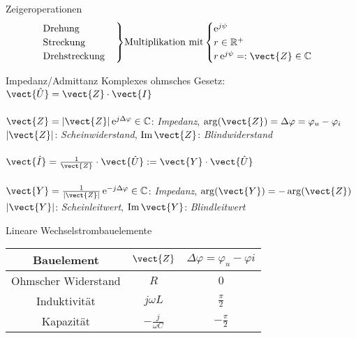\documentclass[a6paper]{kartei}
\newenvironment{rcases}{%
  \left.\renewcommand*\lbrace.%
  \begin{cases}}%
{\end{cases}\right\rbrace}
\begin{document}
\begin{karte}{Zeigeroperationen}
\[ \begin{rcases} \text{Drehung} \\ \text{Streckung} \\ \text{Drehstreckung} \end{rcases} \text{Multiplikation mit} \begin{cases} \operatorname{e}^{j\psi} \\ r \in \mathbb{R}^{+} \\ r\operatorname{e}^{j\psi} =: \vect{Z} \in \mathbb{C} \end{cases} \]
\end{karte}

\begin{karte}{Impedanz/Admittanz}
Komplexes ohmsches Gesetz: $\vect{\hat{U}} = \vect{Z} \cdot \vect{I}$ \\
\\
$\vect{Z} = |\vect{Z}| \operatorname{e}^{j \Delta \varphi} \in \mathbb{C}$: \emph{Impedanz}, $\operatorname{arg}(\vect{Z}) = \Delta \varphi =\varphi_{u} - \varphi_{i}$ \\
$|\vect{Z}|$: \emph{Scheinwiderstand}, $\operatorname{Im} \vect{Z}$: \emph{Blindwiderstand}
\\
\\
$\vect{\hat{I}} = \frac{1}{\vect{Z}} \cdot \vect{\hat{U}} := \vect{Y} \cdot \vect{\hat{U}}$
\\
\\
$\vect{Y} = \frac{1}{|\vect{Z}|} \operatorname{e}^{-j \Delta \varphi} \in \mathbb{C}$: \emph{Impedanz}, $\operatorname{arg}(\vect{Y}) = -\operatorname{arg}(\vect{Z})$ \\
$|\vect{Y}|$: \emph{Scheinleitwert}, $\operatorname{Im} \vect{Y}$: \emph{Blindleitwert}
\end{karte}

\begin{karte}{Lineare Wechselstrombauelemente}
\begin{table}
\centering
\begin{tabular}[h]{c||cc}
Bauelement & $\vect{Z}$ & $\Delta \varphi = \varphi_{u} - \varphi{i}$ \\
\hline
\hline
Ohmscher Widerstand & $R$ & $0$ \\
Induktivität & $j\omega L$ & $\frac{\pi}{2}$ \\
Kapazität & $-\frac{j}{\omega C}$ & $-\frac{\pi}{2}$
\end{tabular}
\end{table}
\end{karte}
\end{document}
